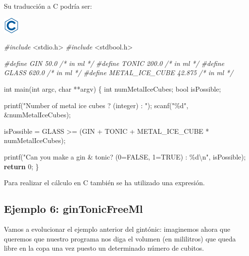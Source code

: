 \documentclass[
]{book}
\newenvironment{Shaded}{\begin{snugshade}}{\end{snugshade}}
\newcommand{\CommentTok}[1]{\textcolor[rgb]{0.56,0.35,0.01}{\textit{#1}}}
\newcommand{\ControlFlowTok}[1]{\textcolor[rgb]{0.13,0.29,0.53}{\textbf{#1}}}
\newcommand{\DataTypeTok}[1]{\textcolor[rgb]{0.13,0.29,0.53}{#1}}
\newcommand{\DecValTok}[1]{\textcolor[rgb]{0.00,0.00,0.81}{#1}}
\newcommand{\ImportTok}[1]{#1}
\newcommand{\NormalTok}[1]{#1}
\newcommand{\PreprocessorTok}[1]{\textcolor[rgb]{0.56,0.35,0.01}{\textit{#1}}}
\newcommand{\SpecialCharTok}[1]{\textcolor[rgb]{0.00,0.00,0.00}{#1}}
\newcommand{\StringTok}[1]{\textcolor[rgb]{0.31,0.60,0.02}{#1}}
\begin{document}
Su traducción a C podría ser:

\includegraphics{./img/c.png}

\begin{Shaded}
\begin{Highlighting}[]
\PreprocessorTok{\#include }\ImportTok{\textless{}stdio.h\textgreater{}}
\PreprocessorTok{\#include }\ImportTok{\textless{}stdbool.h\textgreater{}}

\PreprocessorTok{\#define GIN 50.0              }\CommentTok{/* in ml */}
\PreprocessorTok{\#define TONIC 200.0           }\CommentTok{/* in ml */}
\PreprocessorTok{\#define GLASS 620.0           }\CommentTok{/* in ml */}
\PreprocessorTok{\#define METAL\_ICE\_CUBE 42.875 }\CommentTok{/* in ml */}\PreprocessorTok{ }

\DataTypeTok{int}\NormalTok{ main(}\DataTypeTok{int}\NormalTok{ argc, }\DataTypeTok{char}\NormalTok{ **argv) \{}
    \DataTypeTok{int}\NormalTok{ numMetalIceCubes;}
    \DataTypeTok{bool}\NormalTok{ isPossible;}

\NormalTok{    printf(}\StringTok{"Number of metal ice cubes ? (integer) : "}\NormalTok{);}
\NormalTok{    scanf(}\StringTok{"\%d"}\NormalTok{, \&numMetalIceCubes);}

\NormalTok{    isPossible = GLASS \textgreater{}= (GIN + TONIC + METAL\_ICE\_CUBE * numMetalIceCubes);}

\NormalTok{    printf(}\StringTok{"Can you make a gin \& tonic? (0=FALSE, 1=TRUE) : \%d}\SpecialCharTok{\textbackslash{}n}\StringTok{"}\NormalTok{, isPossible);}
    \ControlFlowTok{return} \DecValTok{0}\NormalTok{;}
\NormalTok{\}}
\end{Highlighting}
\end{Shaded}

Para realizar el cálculo en C también se ha utilizado una expresión.

\hypertarget{ejemplo-6-gintonicfreeml}{%
\subsection{Ejemplo 6: ginTonicFreeMl}\label{ejemplo-6-gintonicfreeml}}

Vamos a evolucionar el ejemplo anterior del gintónic: imaginemos ahora que queremos que nuestro programa nos diga el volumen (en mililitros) que queda libre en la copa una vez puesto un determinado número de cubitos.
\end{document}
